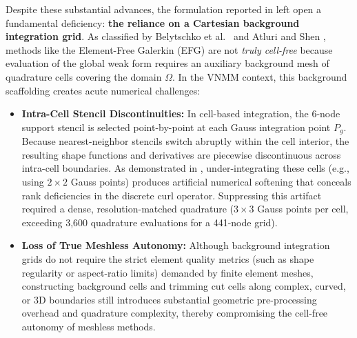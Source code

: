\documentclass[preprint,12pt]{elsarticle}
\begin{document}
Despite these substantial advances, the formulation reported in \cite{stable_vnmm2d_2026} left open a fundamental deficiency: \textbf{the reliance on a Cartesian background integration grid}. As classified by Belytschko et al.~\cite{belytschko1994element} and Atluri and Shen \cite{atluri2002meshless}, methods like the Element-Free Galerkin (EFG) are not \textit{truly cell-free} because evaluation of the global weak form requires an auxiliary background mesh of quadrature cells covering the domain $\Omega$. In the VNMM context, this background scaffolding creates acute numerical challenges:
\begin{itemize}
    \item \textbf{Intra-Cell Stencil Discontinuities:} In cell-based integration, the 6-node support stencil is selected point-by-point at each Gauss integration point $P_g$. Because nearest-neighbor stencils switch abruptly within the cell interior, the resulting shape functions and derivatives are piecewise discontinuous across intra-cell boundaries. As demonstrated in \cite{stable_vnmm2d_2026}, under-integrating these cells (e.g., using $2 \times 2$ Gauss points) produces artificial numerical softening that conceals rank deficiencies in the discrete curl operator. Suppressing this artifact required a dense, resolution-matched quadrature ($3 \times 3$ Gauss points per cell, exceeding 3,600 quadrature evaluations for a 441-node grid).
    \item \textbf{Loss of True Meshless Autonomy:} Although background integration grids do not require the strict element quality metrics (such as shape regularity or aspect-ratio limits) demanded by finite element meshes, constructing background cells and trimming cut cells along complex, curved, or 3D boundaries still introduces substantial geometric pre-processing overhead and quadrature complexity, thereby compromising the cell-free autonomy of meshless methods.
\end{itemize}
\end{document}
